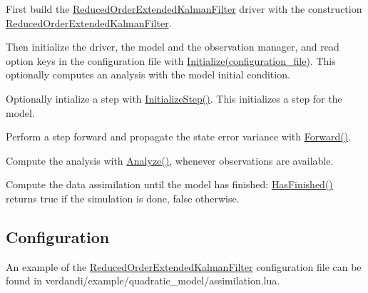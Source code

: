 \documentclass{tufte-book}
\begin{document}
\begin{DoxyEnumerate}
\item \-First build the {\ttfamily  \hyperlink{class_verdandi_1_1_reduced_order_extended_kalman_filter}{\-Reduced\-Order\-Extended\-Kalman\-Filter}} driver with the construction {\ttfamily  \hyperlink{class_verdandi_1_1_reduced_order_extended_kalman_filter_a547ead3b7adf64bad4068d3ed576ac34}{\-Reduced\-Order\-Extended\-Kalman\-Filter}}.


\item \-Then initialize the driver, the model and the observation manager, and read option keys in the configuration file with {\ttfamily  \hyperlink{class_verdandi_1_1_reduced_order_extended_kalman_filter_a9018b22e4b303d8b0b379c992987f9d3}{\-Initialize(configuration\-\_\-file)}}. \-This optionally computes an analysis with the model initial condition.


\item \-Optionally intialize a step with {\ttfamily  \hyperlink{class_verdandi_1_1_reduced_order_extended_kalman_filter_ad6fa4758f55f12b43d1fa03c169f9fe6}{\-Initialize\-Step()}}. \-This initializes a step for the model.


\item \-Perform a step forward and propagate the state error variance with {\ttfamily  \hyperlink{class_verdandi_1_1_reduced_order_extended_kalman_filter_a672093ae1fb9e3353d706ed47cc3a869}{\-Forward()}}.


\item \-Compute the analysis with {\ttfamily  \hyperlink{class_verdandi_1_1_reduced_order_extended_kalman_filter_ad0db0f2ba0f3ba0fa32e9c0bd106865d}{\-Analyze()}}, whenever observations are available.


\item \-Compute the data assimilation until the model has finished\-: {\ttfamily  \hyperlink{class_verdandi_1_1_reduced_order_extended_kalman_filter_aec124f083945014ce06bf6c342c530e4}{\-Has\-Finished()}} returns true if the simulation is done, false otherwise.
\end{DoxyEnumerate}


\hypertarget{roekf_configuration}{}\subsection{\-Configuration}\label{roekf_configuration}

 An example of the {\ttfamily  \hyperlink{class_verdandi_1_1_reduced_order_extended_kalman_filter}{\-Reduced\-Order\-Extended\-Kalman\-Filter}} configuration file can be found in  {\ttfamily verdandi/example/quadratic\_model/assimilation.lua}.
\end{document}
